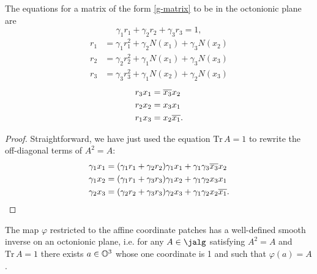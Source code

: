 \begin{lemma}
 The equations for a matrix of the form \eqref{g-matrix} to be in the octonionic plane are 
\begin{equation}\label{eq:trace}
\gamma_1 r_1 + \gamma_2 r_2 + \gamma_3 r_3 = 1,
\end{equation}
\begin{align}
 r_1 & = \gamma_1 r_1^2 + \gamma_2 N(x_1) + \gamma_3 N(x_2) \label{eq:diag1}\\
 r_2 & = \gamma_2 r_2^2 + \gamma_1 N(x_1) + \gamma_3 N(x_3) \label{eq:diag2} \\
 r_3 & = \gamma_3 r_3^2 + \gamma_1 N(x_2) + \gamma_2 N(x_3) \label{eq:diag3}
\end{align}
\begin{align}
 r_3 x_1 &= \overline{x_3}x_2 \label{eq:antidiag1} \\
 r_2 x_2 &= x_3 x_1 \label{eq:antidiag2} \\
 r_1 x_3 &= x_2\overline{x_1}.  \label{eq:antidiag3}
\end{align}
\end{lemma}
\begin{proof}
Straightforward, we have just used the equation $\mathrm{Tr}\, A = 1$ to rewrite the off-diagonal terms of $A^2=A$:
\begin{align*}
\gamma_1 x_1 &= (\gamma_1 r_1 + \gamma_2 r_2)\gamma_1 x_1  + \gamma_1\gamma_3 \overline{x_3}x_2 \\
\gamma_1 x_2 &= (\gamma_1 r_1 + \gamma_3 r_3)\gamma_1 x_2  + \gamma_1\gamma_2 x_3 x_1 \\
\gamma_2 x_3 &= (\gamma_2 r_2 + \gamma_3 r_3)\gamma_2 x_3  + \gamma_1\gamma_2 x_2\overline{x_1}.
\end{align*}


\end{proof}
\begin{lemma}
The map $\varphi$ restricted to the affine coordinate patches has a well-defined smooth inverse on an octonionic plane, i.e. for any $A \in \jalg$ satisfying $A^2 = A$ and $\mathrm{Tr}\, A = 1$ there exists $a\in \mathbb{O}^3$ whose one coordinate is 1 and such that $\varphi(a) = A$.
\end{lemma}
